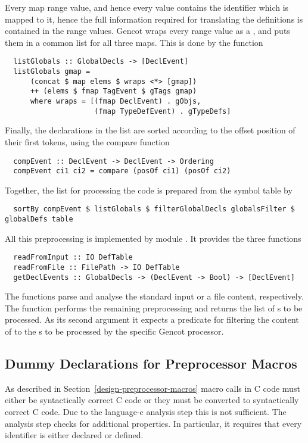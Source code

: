 Every map range value, and hence every  value contains the identifier which is mapped to it, 
hence the full information required for translating the definitions is contained in the range values. 
Gencot wraps every range value as a , and puts them in a common list for all three maps. This
is done by the function
\begin{verbatim}
  listGlobals :: GlobalDecls -> [DeclEvent]
  listGlobals gmap = 
      (concat $ map elems $ wraps <*> [gmap])
      ++ (elems $ fmap TagEvent $ gTags gmap)
      where wraps = [(fmap DeclEvent) . gObjs, 
                     (fmap TypeDefEvent) . gTypeDefs]
\end{verbatim}

Finally, the declarations in the list are sorted according to the offset position of their first tokens, using the
compare function
\begin{verbatim}
  compEvent :: DeclEvent -> DeclEvent -> Ordering
  compEvent ci1 ci2 = compare (posOf ci1) (posOf ci2)
\end{verbatim}

Together, the list for processing the code is prepared from the symbol table  by
\begin{verbatim}
  sortBy compEvent $ listGlobals $ filterGlobalDecls globalsFilter $ globalDefs table
\end{verbatim}

All this preprocessing is implemented by module . It provides the three functions
\begin{verbatim}
  readFromInput :: IO DefTable
  readFromFile :: FilePath -> IO DefTable
  getDeclEvents :: GlobalDecls -> (DeclEvent -> Bool) -> [DeclEvent]
\end{verbatim}
The  functions parse and analyse the standard input or a file content, respectively. The function
 performs the remaining preprocessing and returns the list of s to be processed.
As its second argument it expects a predicate for filtering the content of  to the
s to be processed by the specific Gencot processor.

\subsection{Dummy Declarations for Preprocessor Macros}
\label{impl-ccode-dummydecl}

As described in Section~\ref{design-preprocessor-macros} macro calls in C code must either be syntactically correct
C code or they must be converted to syntactically correct C code. Due to the language-c analysis step this is not 
sufficient. The analysis step checks for additional properties. In particular, it requires that every identifier 
is either declared or defined.

